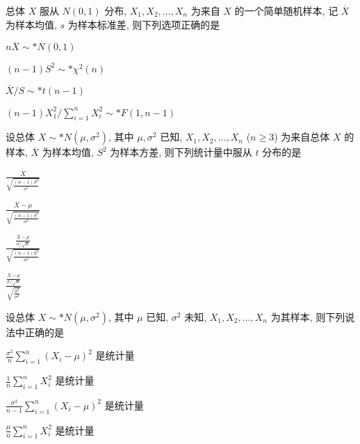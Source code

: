 \documentclass{exam-zh}
\begin{document}
\begin{question}
  总体 $X$ 服从 $N(0,1)$ 分布, $X_1, X_2, \dots, X_n$ 为来自 $X$ 的一个简单随机样本, 记 $\overline{X}$ 为样本均值, $s$ 为样本标准差, 则下列选项正确的是
  \paren[D]

  \begin{choices}
    \item $n\overline{X} \sim* N(0, 1)$
    \item $(n-1)S^2 \sim* \chi^2(n)$
    \item $\overline{X}/S \sim* t(n-1)$
    \item $(n-1)X_1^2 / \sum_{i=1}^{n}X_i^2 \sim* F(1, n-1)$
  \end{choices}
\end{question}

\begin{question}
  设总体 $X \sim* N(\mu, \sigma^2)$, 其中 $\mu, \sigma^2$ 已知, $X_1, X_2, \dots, X_n$ ($n \ge 3$) 为来自总体 $X$ 的样本, $\overline{X}$ 为样本均值, $S^2$ 为样本方差, 则下列统计量中服从 $t$ 分布的是
  \paren[D]

  \begin{choices}
    \item $\frac{\overline{X}}{\sqrt{\frac{(n-1)S^2}{\sigma^2}}}$
    \item $\frac{\overline{X} - \mu}{\sqrt{\frac{(n-1)S^2}{\sigma^2}}}$
    \item $\frac{\frac{\overline{X} - \mu}{\sigma / \sqrt{n}}}{\sqrt{\frac{(n-1)S^2}{\sigma^2}}}$
    \item $\frac{\frac{\overline{X} - \mu}{\sigma / \sqrt{n}}}{\sqrt{\frac{S^2}{\sigma^2}}}$
  \end{choices}
\end{question}

\begin{question}
  设总体 $X \sim* N(\mu, \sigma^2)$, 其中 $\mu$ 已知, $\sigma^2$ 未知, $X_1, X_2, \dots, X_n$ 为其样本, 则下列说法中正确的是
  \paren[D]

  \begin{choices}
    \item $\frac{\sigma^2}{n}\sum_{i=1}^{n}(X_i - \mu)^2$ 是统计量
    \item $\frac{1}{n}\sum_{i=1}^{n}X_i^2$ 是统计量
    \item $\frac{\sigma^2}{n-1}\sum_{i=1}^{n}(X_i - \mu)^2$ 是统计量
    \item $\frac{\mu}{n}\sum_{i=1}^{n}X_i^2$ 是统计量
  \end{choices}
\end{question}
\end{document}
